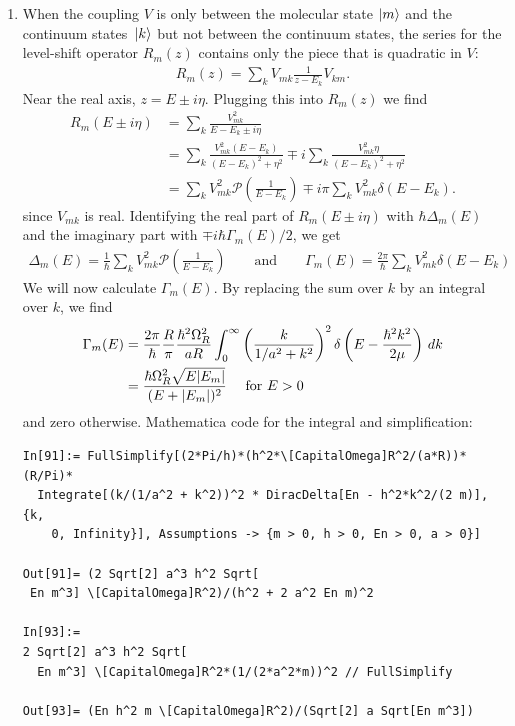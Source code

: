\documentclass{article}
\theoremstyle{definition}
\newcommand{\f}[2]{\frac{#1}{#2}}
\newcommand{\lp}{\left(}
\newcommand{\rp}{\right)}
\begin{document}
\begin{enumerate}[label=(\alph*)]
\item When the coupling $V$ is only between the molecular state $\ket{m}$ and the continuum states $\ket*{k}$ but not between the continuum states, the series for the level-shift operator $R_m(z)$ contains only the piece that is quadratic in $V$:
\begin{align*}
R_m(z) = \sum_{k } V_{mk} \f{1}{z - E_k}  V_{km}. 
\end{align*}
Near the real axis, $z =  E \pm i\eta$. Plugging this into $R_m(z)$ we find 
\begin{align*}
R_m(E \pm i\eta) 
&= \sum_k \f{V^2_{mk} }{E - E_k \pm i\eta } \\
&=  \sum_k \f{V_{mk}^2  (E-E_k)}{ (E - E_k)^2 + \eta^2}   \mp i \sum_k  \f{V_{mk}^2\eta}{(E-E_k)^2 + \eta^2}\\
&= \sum_k V_{mk}^2 \mathcal{P}\lp \f{1}{E-E_k} \rp \mp i\pi \sum_k V_{mk}^2 \delta(E-E_k).
\end{align*}
since $V_{mk}$ is real. Identifying the real part of $R_m(E\pm i\eta)$ with $\hbar \Delta_m (E)$ and the imaginary part with $\mp i\hbar \Gamma_m(E)/2$, we get
\begin{align*}
\Delta_m (E) = \f{1}{\hbar} \sum_k V_{mk}^2 \mathcal{P}\lp \f{1}{E-E_k} \rp
\quad\quad\text{and}\quad\quad 
 \Gamma_m(E)= \f{2\pi}{\hbar} \sum_k V_{mk}^2 \delta(E-E_k)
\end{align*}
We will now calculate $\Gamma_m(E)$. By replacing the sum over $k$ by an integral over $k$, we find
\begin{align*}
\Gamma_m(E) 
&= \f{2\pi}{\hbar} \f{R}{\pi}  \f{\hbar^2 \Omega_R^2}{aR} \int_{0}^\infty \lp \f{k}{1/a^2 + k^2} \rp^2 \delta\lp E - \f{\hbar^2 k^2}{2\mu} \rp \, dk \\
&= \f{\hbar \Omega^2_R \sqrt{E \abs{E_m}}}{(E + \abs{E_m})^2} \quad \text{ for } E > 0
\end{align*}
and zero otherwise. Mathematica code for the integral and simplification:
\begin{lstlisting}
In[91]:= FullSimplify[(2*Pi/h)*(h^2*\[CapitalOmega]R^2/(a*R))*(R/Pi)*
  Integrate[(k/(1/a^2 + k^2))^2 * DiracDelta[En - h^2*k^2/(2 m)], {k, 
    0, Infinity}], Assumptions -> {m > 0, h > 0, En > 0, a > 0}]

Out[91]= (2 Sqrt[2] a^3 h^2 Sqrt[
 En m^3] \[CapitalOmega]R^2)/(h^2 + 2 a^2 En m)^2

In[93]:= 
2 Sqrt[2] a^3 h^2 Sqrt[
  En m^3] \[CapitalOmega]R^2*(1/(2*a^2*m))^2 // FullSimplify

Out[93]= (En h^2 m \[CapitalOmega]R^2)/(Sqrt[2] a Sqrt[En m^3])


\end{lstlisting}
\end{enumerate}
\end{document}
